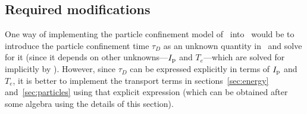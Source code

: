 \documentclass{notes}
\newcommand{\Ip}{I_{\rm p}}
\begin{document}

    \subsection{Required modifications}
    One way of implementing the particle confinement model of \DYON\ into
    \DREAM\ would be to introduce the particle confinement time $\tau_D$ as an
    unknown quantity in \DREAM\ and solve for it (since it depends on other
    unknowns---$\Ip$ and $T_e$---which are solved for implicitly by \DREAM).
    However, since $\tau_D$ can be expressed explicitly in terms of $\Ip$ and
    $T_e$, it is better to implement the transport terms in
    sections~\ref{sec:energy} and~\ref{sec:particles} using that explicit
    expression (which can be obtained after some algebra using the details of
    this section).
    
\end{document}
